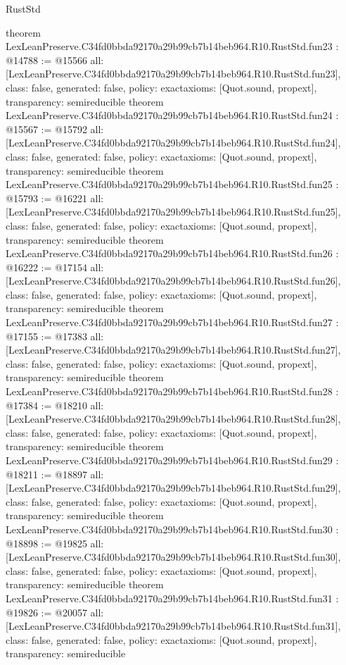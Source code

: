 \begin{lexlean}{RustStd}
\begin{coremodule}
{}
theorem LexLeanPreserve.C34fd0bbda92170a29b99cb7b14beb964.R10.RustStd.fun23 : @14788 := @15566 {
  all: [LexLeanPreserve.C34fd0bbda92170a29b99cb7b14beb964.R10.RustStd.fun23],
  class: false,
  generated: false,
  policy: exact{axioms: [Quot.sound, propext]},
  transparency: semireducible
}
theorem LexLeanPreserve.C34fd0bbda92170a29b99cb7b14beb964.R10.RustStd.fun24 : @15567 := @15792 {
  all: [LexLeanPreserve.C34fd0bbda92170a29b99cb7b14beb964.R10.RustStd.fun24],
  class: false,
  generated: false,
  policy: exact{axioms: [Quot.sound, propext]},
  transparency: semireducible
}
theorem LexLeanPreserve.C34fd0bbda92170a29b99cb7b14beb964.R10.RustStd.fun25 : @15793 := @16221 {
  all: [LexLeanPreserve.C34fd0bbda92170a29b99cb7b14beb964.R10.RustStd.fun25],
  class: false,
  generated: false,
  policy: exact{axioms: [Quot.sound, propext]},
  transparency: semireducible
}
theorem LexLeanPreserve.C34fd0bbda92170a29b99cb7b14beb964.R10.RustStd.fun26 : @16222 := @17154 {
  all: [LexLeanPreserve.C34fd0bbda92170a29b99cb7b14beb964.R10.RustStd.fun26],
  class: false,
  generated: false,
  policy: exact{axioms: [Quot.sound, propext]},
  transparency: semireducible
}
theorem LexLeanPreserve.C34fd0bbda92170a29b99cb7b14beb964.R10.RustStd.fun27 : @17155 := @17383 {
  all: [LexLeanPreserve.C34fd0bbda92170a29b99cb7b14beb964.R10.RustStd.fun27],
  class: false,
  generated: false,
  policy: exact{axioms: [Quot.sound, propext]},
  transparency: semireducible
}
theorem LexLeanPreserve.C34fd0bbda92170a29b99cb7b14beb964.R10.RustStd.fun28 : @17384 := @18210 {
  all: [LexLeanPreserve.C34fd0bbda92170a29b99cb7b14beb964.R10.RustStd.fun28],
  class: false,
  generated: false,
  policy: exact{axioms: [Quot.sound, propext]},
  transparency: semireducible
}
theorem LexLeanPreserve.C34fd0bbda92170a29b99cb7b14beb964.R10.RustStd.fun29 : @18211 := @18897 {
  all: [LexLeanPreserve.C34fd0bbda92170a29b99cb7b14beb964.R10.RustStd.fun29],
  class: false,
  generated: false,
  policy: exact{axioms: [Quot.sound, propext]},
  transparency: semireducible
}
theorem LexLeanPreserve.C34fd0bbda92170a29b99cb7b14beb964.R10.RustStd.fun30 : @18898 := @19825 {
  all: [LexLeanPreserve.C34fd0bbda92170a29b99cb7b14beb964.R10.RustStd.fun30],
  class: false,
  generated: false,
  policy: exact{axioms: [Quot.sound, propext]},
  transparency: semireducible
}
theorem LexLeanPreserve.C34fd0bbda92170a29b99cb7b14beb964.R10.RustStd.fun31 : @19826 := @20057 {
  all: [LexLeanPreserve.C34fd0bbda92170a29b99cb7b14beb964.R10.RustStd.fun31],
  class: false,
  generated: false,
  policy: exact{axioms: [Quot.sound, propext]},
  transparency: semireducible
}
\end{coremodule}
\end{lexlean}
